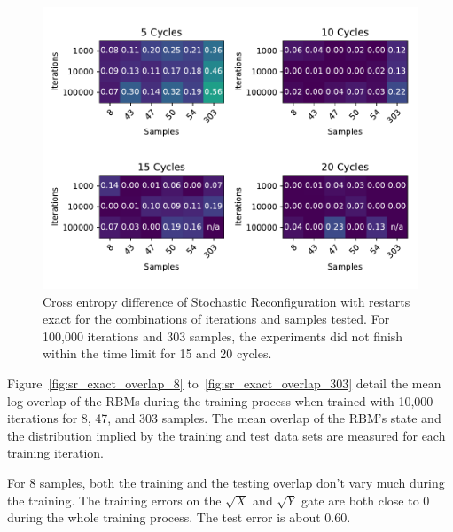 \begin{figure}[H]
  \centering
  \includegraphics[width=\textwidth]{figures/results/SR-restarts-not-learned/fxeb_heatmap.pdf}
  \caption[Cross entropy difference of Stochastic Reconfiguration with restarts exact]{Cross entropy difference of Stochastic 
  Reconfiguration with restarts exact for the combinations of iterations and samples tested.
  For 100,000 iterations and 303 samples, the experiments did not finish within the time limit for 15 and 20 cycles.}
  \label{fig:sr_exact_fxeb}
\end{figure}

Figure~\ref{fig:sr_exact_overlap_8} to~\ref{fig:sr_exact_overlap_303} detail the mean log overlap of the RBMs during the 
training process when trained with 10,000 iterations for 8, 47, and 303 samples. The 
mean overlap of the RBM's state and the distribution implied by the training and test data sets are measured 
for each training iteration.

For 8 samples, both the training and the testing overlap don't vary much during the training. The training errors on the $\sqrt{X}$ and 
$\sqrt{Y}$ gate are both close to 0 during the whole training process. The test error is about 0.60.

